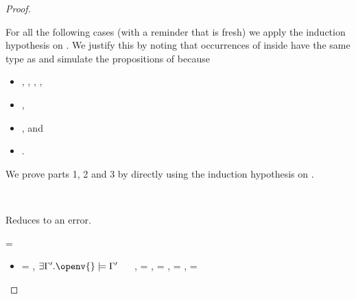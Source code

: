\begin{lemma}
\begin{proof}
\begin{case}[B-Let]
\begin{itemize}
\begin{subcase}[T-Let]
        For all the following cases (with a reminder that \x{} is fresh)
        we apply the induction hypothesis on . We justify this by noting
        that occurrences of \x{} inside  have the same type as  and 
        simulate the propositions of 
        because 
        \begin{itemize}
          \item
  \judgementrewrite
       {\propenv{}, {\isprop {\s{}} {\x{}}},
         {\propp{}},
         {\proppp{}}}
             {} {\ty{}} {\filterset {\thenprop {\prop{}}} {\elseprop {\prop{}}}}
             {\object{}} 
             {},
           \item
        ,
           \item
        {},
        and
           \item
         {} {\val{}}.
    \end{itemize}

        We prove parts 1, 2 and 3 by directly using the induction hypothesis on .
      \end{subcase}
  \end{itemize}
\end{case}

\begin{case}[BE-Let]
  \ 
  
  Reduces to an error.
\end{case}

\begin{case}[B-Abs] 
        \val{} = {\closure {\openv{}} {\abs {\x{}} {\s{}} {}}}

  \begin{itemize}
    \item[]
      \begin{subcase}[T-Clos]
  \ep{} = {\closure {\openv{}} {\abs {\x{}} {\s{}} {}}},
  $\exists {\propenvp{}}. \satisfies{\openv{}}{\propenvp{}}$
  \ \ 
\judgementrewrite {\propenvp{}} {\abs {\x{}} {\s{}} {}} {\ty{}}
                 {\filterset {\thenprop {\prop{f}}}
                             {}}
                 {}
                 {\abs {\x{}} {\s{}} {}},
  \e{} = {\closure {\openv{}} {\abs {\x{}} {\s{}} {}}},
                 {\thenprop{\prop{}}} = \topprop{},
                 {\elseprop{\prop{}}} = \botprop{},
                 {\object{}} = \emptyobject{}


\end{subcase}
\end{itemize}
\end{case}
\end{proof}
\end{lemma}
